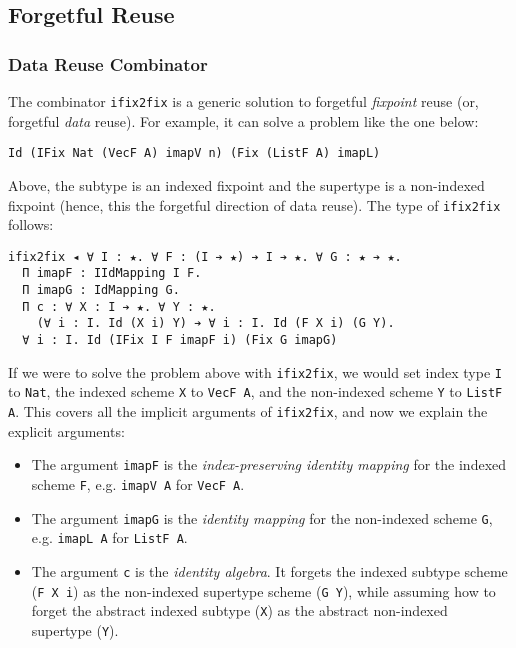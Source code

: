 \documentclass[acmsmall,screen]{acmart}
\newcommand{\labsec}[1]{\label{sec:#1}}
\begin{document}
\subsection{Forgetful Reuse}
\labsec{data:fog}

\subsubsection{Data Reuse Combinator}

The combinator \verb;ifix2fix; is a generic solution to forgetful
\textit{fixpoint} reuse (or, forgetful \textit{data} reuse). For
example, it can solve a problem like the one below:
\begin{verbatim}
Id (IFix Nat (VecF A) imapV n) (Fix (ListF A) imapL)
\end{verbatim}
Above, the subtype is an indexed fixpoint and the supertype is a
non-indexed fixpoint (hence, this the forgetful direction of data
reuse). The type of \verb;ifix2fix; follows:
\begin{verbatim}
ifix2fix ◂ ∀ I : ★. ∀ F : (I ➔ ★) ➔ I ➔ ★. ∀ G : ★ ➔ ★. 
  Π imapF : IIdMapping I F. 
  Π imapG : IdMapping G.
  Π c : ∀ X : I ➔ ★. ∀ Y : ★. 
    (∀ i : I. Id (X i) Y) ➔ ∀ i : I. Id (F X i) (G Y).
  ∀ i : I. Id (IFix I F imapF i) (Fix G imapG)
\end{verbatim}
If we were to solve the problem above with \verb;ifix2fix;,
we would set index type \verb;I; to \verb;Nat;,
the indexed scheme \verb;X; to
\verb;VecF A;, and the non-indexed scheme \verb;Y; to \verb;ListF A;.
This covers all the implicit arguments of \verb;ifix2fix;,
and now we explain the explicit arguments:

\begin{itemize}
\item The argument \verb;imapF;  is the
  \textit{index-preserving identity mapping} for the indexed scheme \verb;F;,
  e.g. \verb;imapV A; for \verb;VecF A;.

\item The argument \verb;imapG; is the
  \textit{identity mapping} for the non-indexed scheme \verb;G;,
  e.g. \verb;imapL A; for \verb;ListF A;.

\item The argument \verb;c; is the \textit{identity algebra}. It
  forgets the indexed subtype scheme (\verb;F X i;) as
  the non-indexed supertype scheme (\verb;G Y;), while assuming
  how to forget the abstract indexed subtype (\verb;X;) as the
  abstract non-indexed supertype (\verb;Y;).
\end{itemize}
\end{document}
